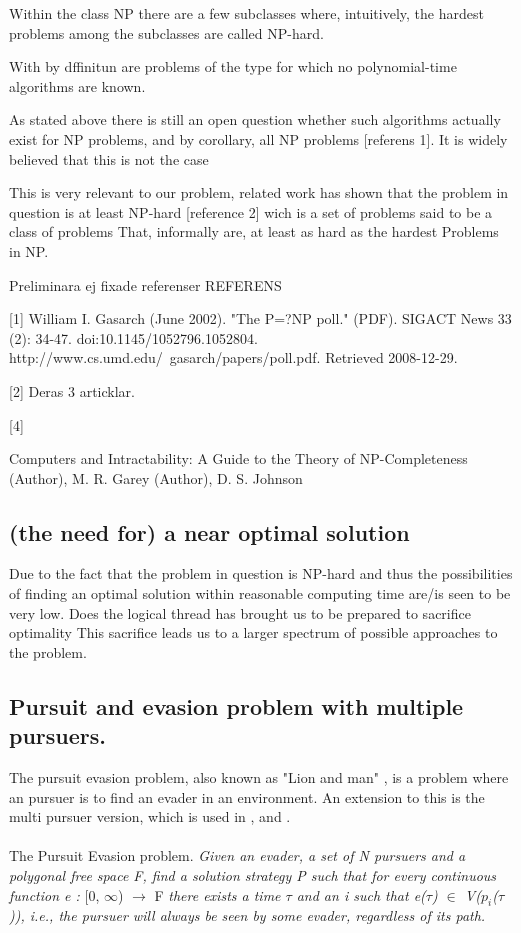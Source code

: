 Within the class NP there are a few subclasses where, intuitively, the hardest problems among the subclasses are called NP-hard.

With by dffinitun are problems of the type for which no polynomial-time algorithms are known. 

As stated above there is still an open question whether such algorithms actually exist for NP problems, and by corollary, all NP problems [referens 1]. It is widely believed that this is not the case 

This is very relevant to our problem, related work has shown that the problem in question is at least NP-hard [reference 2] wich is a set of problems said to be a class of problems That, informally are, at least as hard as the hardest Problems in NP.




Preliminara ej fixade referenser 
REFERENS 

[1]
William I. Gasarch (June 2002). "The P=?NP poll." (PDF). SIGACT News 33 (2): 34-47. doi:10.1145/1052796.1052804. http://www.cs.umd.edu/~gasarch/papers/poll.pdf. Retrieved 2008-12-29.

[2] 
Deras 3 articklar.


[4]

Computers and Intractability: A Guide to the Theory of NP-Completeness  (Author),  M. R. Garey (Author), D. S. Johnson


\subsection{(the need for) a near optimal solution}

Due to the fact that the problem in question is NP-hard and thus the possibilities of finding an optimal solution within reasonable computing time are/is seen to be very low. Does the logical thread has brought us to be prepared to sacrifice optimality
This sacrifice leads us to a larger spectrum of possible approaches to the problem.

 \subsection {Pursuit and evasion problem with multiple pursuers.}
The pursuit evasion problem, also known as "Lion and man" \cite{Dumitrescu08}, is a problem where an pursuer is to find an evader in an environment. An extension to this is the multi pursuer version, which is used in \cite{paper1},\cite{paper2} and \cite{paper3}.\\
\\
The Pursuit Evasion problem. \emph{Given an evader, a set of N pursuers and a polygonal free space F, find a solution strategy P such that for every continuous function e : }[0, $\infty$) $\rightarrow$ F \emph{there exists a time $\tau$ and an i such that e($\tau$) $\in$ V($p_i$($\tau$)), i.e., the pursuer will always be seen by some evader, regardless of its path.}\cite{paper1}

